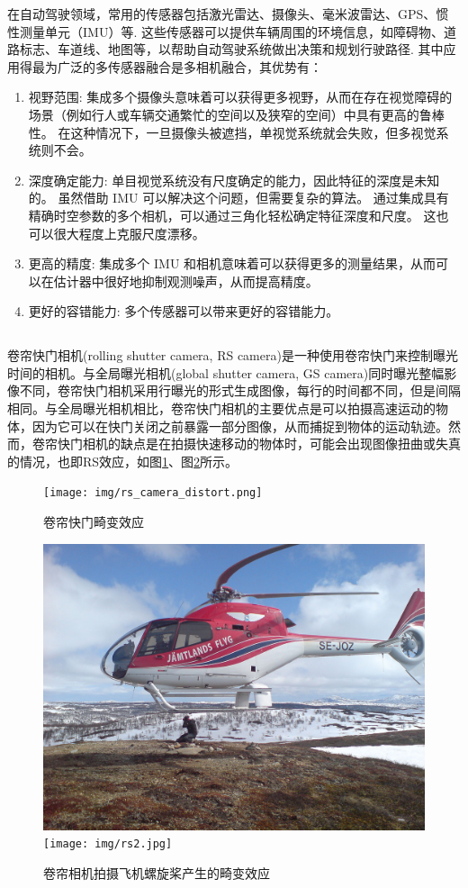 \documentclass[12pt, twocolumn]{article}
\newcommand\normf{\fangsong}
\begin{document}
	在自动驾驶领域，常用的传感器包括激光雷达、摄像头、毫米波雷达、GPS、惯性测量单元（IMU）等. 这些传感器可以提供车辆周围的环境信息，如障碍物、道路标志、车道线、地图等，以帮助自动驾驶系统做出决策和规划行驶路径. 其中应用得最为广泛的多传感器融合是多相机融合，其优势有：
	\begin{enumerate}
		\item 视野范围: 集成多个摄像头意味着可以获得更多视野，从而在存在视觉障碍的场景（例如行人或车辆交通繁忙的空间以及狭窄的空间）中具有更高的鲁棒性。
		在这种情况下，一旦摄像头被遮挡，单视觉系统就会失败，但多视觉系统则不会。
		
		\item 深度确定能力: 单目视觉系统没有尺度确定的能力，因此特征的深度是未知的。 虽然借助 IMU 可以解决这个问题，但需要复杂的算法。 通过集成具有精确时空参数的多个相机，可以通过三角化轻松确定特征深度和尺度。 这也可以很大程度上克服尺度漂移。
		
		\item 更高的精度: 集成多个 IMU 和相机意味着可以获得更多的测量结果，从而可以在估计器中很好地抑制观测噪声，从而提高精度。
		
		\item 更好的容错能力: 多个传感器可以带来更好的容错能力。
	\end{enumerate}
	\subsection{\normf{卷帘快门相机}}
	卷帘快门相机(rolling shutter camera, RS camera)是一种使用卷帘快门来控制曝光时间的相机。与全局曝光相机(global shutter camera, GS camera)同时曝光整幅影像不同，卷帘快门相机采用行曝光的形式生成图像，每行的时间都不同，但是间隔相同。与全局曝光相机相比，卷帘快门相机的主要优点是可以拍摄高速运动的物体，因为它可以在快门关闭之前暴露一部分图像，从而捕捉到物体的运动轨迹。然而，卷帘快门相机的缺点是在拍摄快速移动的物体时，可能会出现图像扭曲或失真的情况，也即RS效应，如图\ref{fig:卷帘快门畸变效应}、图\ref{fig:卷帘快门拍摄飞机螺旋桨产生的畸变效应}所示。
	
	\begin{figure}[h]
		\centering
		\texttt{[image: img/rs\_camera\_distort.png]}
		\caption{\normf 卷帘快门畸变效应}
		\label{fig:卷帘快门畸变效应}
	\end{figure}
	
	\begin{figure}[h]
		\centering
		\includegraphics[width=0.49\linewidth]{img/rs1.jpeg}
		\texttt{[image: img/rs2.jpg]}
		\caption{\normf 卷帘相机拍摄飞机螺旋桨产生的畸变效应}
		\label{fig:卷帘快门拍摄飞机螺旋桨产生的畸变效应}
	\end{figure}
		
\end{document}
